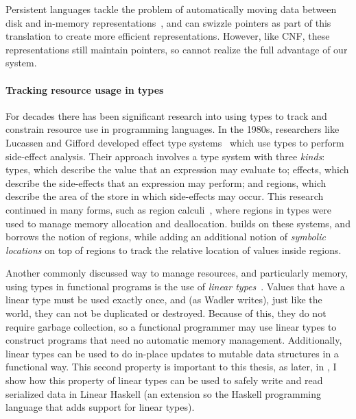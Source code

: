 

{Persistent languages tackle the problem of automatically moving data between disk
and in-memory representations~\cite{persistent-java,persistent-object-systems,persistent-objects-thor}, and can swizzle pointers as part of this
translation to create more efficient representations. However, like CNF, these
representations still maintain pointers, so cannot realize the full advantage of
our system.}

\paragraph{Tracking resource usage in types}


For decades there has been significant research into using types to track and
constrain resource use in programming languages. In the 1980s, researchers like
Lucassen and Gifford developed effect type systems~\cite{effect-types} which use
types to perform side-effect analysis. Their approach involves a type system
with three \emph{kinds}: types, which describe the value that an expression may
evaluate to; effects, which describe the side-effects that an expression may
perform; and regions, which describe the area of the store in which side-effects
may occur.
%
This research continued in many forms, such as region
calculi~\cite{mlkit-retrospective, regioncalcs, cyclone-pldi}, where regions in
types were used to manage memory allocation and deallocation. \ourcalc{}
builds on these systems, and borrows the notion of regions, while adding
an additional notion of \emph{symbolic locations} on top of regions to
track the relative location of values inside regions.

Another commonly discussed way to manage resources, and particularly memory,
using types in functional programs is the use of \emph{linear
types}~\cite{wadler-linear-types}. Values that have a linear type must be used
exactly once, and (as Wadler writes), just like the world, they can not be
duplicated or destroyed. Because of this, they do not require garbage
collection, so a functional programmer may use linear types to construct
programs that need no automatic memory management. Additionally, linear types
can be used to do in-place updates to mutable data structures in a functional
way. This second property is important to this thesis, as later, in
, I show how this property of linear types can be used to
safely write and read serialized data in Linear Haskell (an extension so the Haskell
programming language that adds support for linear types).



